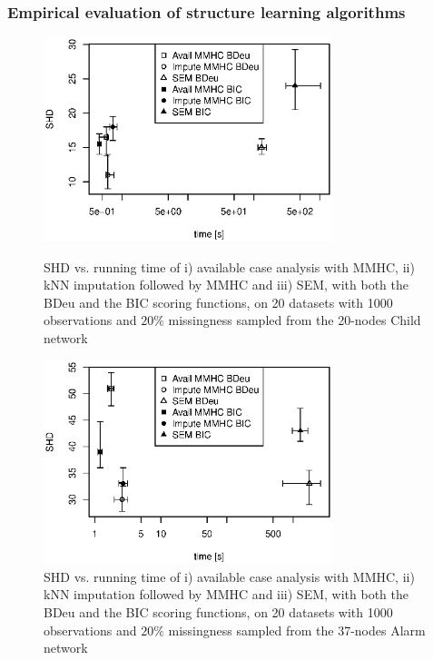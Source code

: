 \documentclass{article}\usepackage[]{graphicx}\usepackage[]{color}
\begin{document}
\subsubsection{Empirical evaluation of structure learning algorithms}
\begin{figure}[!tpb]%
\centerline{\includegraphics[width=0.75\textwidth]{figure/child_crosses_1000.eps}}
\caption{SHD vs. running time of i) available case analysis with MMHC, ii) kNN imputation followed by MMHC and iii) SEM, with both the BDeu and the BIC scoring functions, on 20 datasets with 1000 observations and $20\%$ missingness sampled from the 20-nodes Child network}\label{fig:childcrosses}

\centerline{\includegraphics[width=0.75\textwidth]{figure/alarm_crosses_1000.eps}}
\caption{SHD vs. running time of i) available case analysis with MMHC, ii) kNN imputation followed by MMHC and iii) SEM, with both the BDeu and the BIC scoring functions, on 20 datasets with 1000 observations and $20\%$ missingness sampled from the 37-nodes Alarm network}\label{fig:alarmcrosses}
\end{figure}
\end{document}
